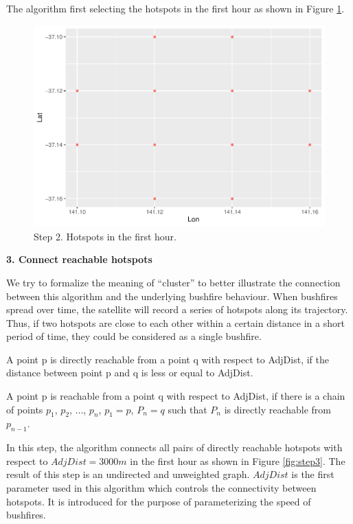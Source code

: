 The algorithm first selecting the hotspots in the first hour as shown in
Figure \ref{fig:step2}.

\begin{Schunk}
\begin{figure}
\includegraphics[width=0.8\linewidth]{clustering_paper_files/figure-latex/step2-1} \caption[Step 2]{Step 2. Hotspots in the first hour.}\label{fig:step2}
\end{figure}
\end{Schunk}

\textbf{3. Connect reachable hotspots}

We try to formalize the meaning of ``cluster'' to better illustrate the
connection between this algorithm and the underlying bushfire behaviour.
When bushfires spread over time, the satellite will record a series of
hotspots along its trajectory. Thus, if two hotspots are close to each
other within a certain distance in a short period of time, they could be
considered as a single bushfire.

\begin{defn} A point p is directly reachable from a point q with respect to AdjDist, if the distance between point p and q is less or equal to AdjDist.\end{defn}

\begin{defn}[reachable] A point p is reachable from a point q with respect to AdjDist, if there is a chain of points $p_1$, $p_2$, ..., $p_n$, $p_1 = p$, $P_n = q$ such that $P_n$ is directly reachable from $p_{n-1}$. \end{defn}

In this step, the algorithm connects all pairs of directly reachable
hotspots with respect to \(AdjDist = 3000m\) in the first hour as shown
in Figure \ref{fig:step3}. The result of this step is an undirected and
unweighted graph. \(AdjDist\) is the first parameter used in this
algorithm which controls the connectivity between hotspots. It is
introduced for the purpose of parameterizing the speed of bushfires.

